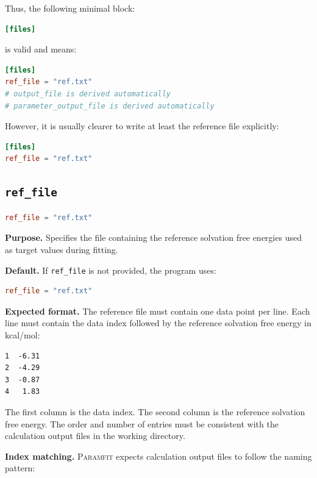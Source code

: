 \documentclass[11pt]{article}
\begin{document}
Thus, the following minimal block:

\begin{lstlisting}[language=toml]
[files]
\end{lstlisting}

is valid and means:

\begin{lstlisting}[language=toml]
[files]
ref_file = "ref.txt"
# output_file is derived automatically
# parameter_output_file is derived automatically
\end{lstlisting}

However, it is usually clearer to write at least the reference file explicitly:

\begin{lstlisting}[language=toml]
[files]
ref_file = "ref.txt"
\end{lstlisting}

\subsection{\texttt{ref\_file}}

\begin{lstlisting}[language=toml]
ref_file = "ref.txt"
\end{lstlisting}

\textbf{Purpose.}
Specifies the file containing the reference solvation free energies used as
target values during fitting.

\textbf{Default.}
If \texttt{ref\_file} is not provided, the program uses:

\begin{lstlisting}[language=toml]
ref_file = "ref.txt"
\end{lstlisting}

\textbf{Expected format.}
The reference file must contain one data point per line. Each line must contain
the data index followed by the reference solvation free energy in kcal/mol:

\begin{lstlisting}
1  -6.31
2  -4.29
3  -0.87
4   1.83
\end{lstlisting}

The first column is the data index. The second column is the reference
solvation free energy. The order and number of entries must be consistent with
the calculation output files in the working directory.

\textbf{Index matching.}
\textsc{Paramfit} expects calculation output files to follow the naming pattern:
\end{document}
